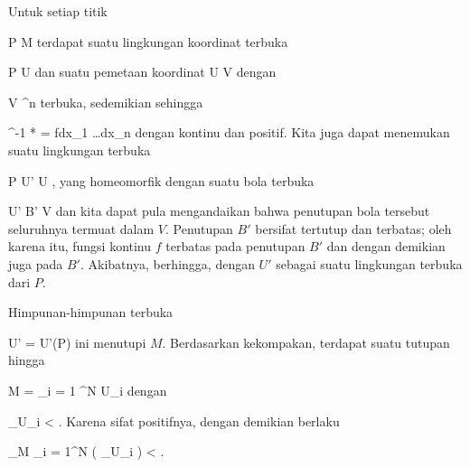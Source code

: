 Untuk setiap titik

\mavergleichskette
{\vergleichskette
{ P
}
{ \in }{ M
}
{  }{
}
{    }{
}
{   }{
}
}
{}{}{}
terdapat suatu lingkungan koordinat terbuka

\mavergleichskette
{\vergleichskette
{ P
}
{ \in }{ U
}
{  }{
}
{    }{
}
{   }{
}
}
{}{}{}
dan suatu pemetaan koordinat
\maabbdisp {\alpha} { U } { V
} {}
dengan

\mavergleichskette
{\vergleichskette
{ V
}
{ \subseteq }{ \R^n
}
{  }{
}
{    }{
}
{   }{
}
}
{}{}{}
terbuka, sedemikian sehingga

\mavergleichskette
{\vergleichskette
{ \alpha^{-1 *} \omega
}
{ = }{ fdx_1 \wedge \ldots \wedge dx_n
}
{  }{
}
{    }{
}
{   }{
}
}
{}{}{}
dengan
 kontinu dan positif. Kita juga dapat menemukan suatu lingkungan terbuka

\mavergleichskette
{\vergleichskette
{ P
}
{ \in }{ U'
}
{ \subseteq }{ U
}
{    }{
}
{   }{
}
}
{}{}{,}
yang homeomorfik dengan suatu bola terbuka

\mavergleichskette
{\vergleichskette
{ U'
}
{ \cong }{ B'
}
{ \subseteq }{ V
}
{    }{
}
{   }{
}
}
{}{}{}
dan kita dapat pula mengandaikan bahwa penutupan bola tersebut seluruhnya termuat dalam $V$. Penutupan $B'$ bersifat tertutup dan terbatas; oleh karena itu, fungsi kontinu $f$ terbatas pada penutupan $B'$ dan dengan demikian juga pada $B'$. Akibatnya,
 berhingga, dengan $U'$ sebagai suatu lingkungan terbuka dari $P$.

Himpunan-himpunan terbuka

\mavergleichskette
{\vergleichskette
{ U'
}
{ = }{ U'(P)
}
{  }{
}
{    }{
}
{   }{
}
}
{}{}{}
ini menutupi $M$. Berdasarkan kekompakan, terdapat suatu tutupan hingga

\mavergleichskettedisp
{\vergleichskette
{ M
}
{ =} { \bigcup_{i = 1} ^N U_i
}
{ } {
}
{ } {
}
{ } {
}
}
{}{}{}
dengan

\mavergleichskettedisp
{\vergleichskette
{ \int_{U_i } \omega
}
{ <} { \infty
}
{ } {
}
{ } {
}
{ } {
}
}
{}{}{.}
Karena sifat positifnya, dengan demikian berlaku

\mavergleichskettedisp
{\vergleichskette
{ \int_{M} \omega
}
{ \leq} { \sum_{i = 1}^N  \left(  \int_{U_i } \omega  \right)
}
{ <} { \infty
}
{ } {
}
{ } {
}
}
{}{}{.}
